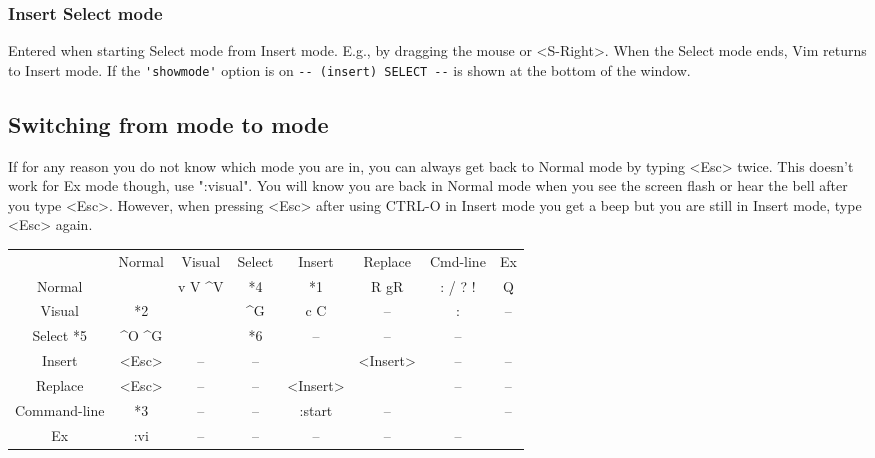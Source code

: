 \subsubsection{Insert Select mode}
Entered when starting Select mode from Insert mode.
E.g., by dragging the mouse or <S-Right>.
When the Select mode ends, Vim returns to Insert mode.
If the \verb!'showmode'! option is on \verb!-- (insert) SELECT --!
is shown at the bottom of the window.

\subsection{Switching from mode to mode}
\label{mode-switching}

If for any reason you do not know which mode you are in, you can always get back to Normal mode by typing <Esc> twice.
This doesn't work for Ex mode though, use ":visual".
You will know you are back in Normal mode when you see the screen flash or hear the bell after you type <Esc>.
However, when pressing <Esc> after using CTRL-O in Insert mode you get a beep but you are still in Insert mode, type <Esc> again.

\label{i_esc}
\begin{tabular}{c c c c c c c c}
				\backslashbox{FROM mode}{TO mode} & Normal & Visual                & Select & Insert   & Replace  & Cmd-line & Ex \\
				Normal                        &        & v       V       \textasciicircum V    & *4     & *1       & R gR     & : / ? !  & Q\\
				Visual                        & *2     &                       & \textasciicircum G     & c      C & --       & :        & --\\
				Select           *5     & \textasciicircum O                 \textasciicircum G &        & *6       & --       & --       & --\\
				Insert                            & <Esc>  & --                    & --     &          & <Insert> & --       & --\\
				Replace                           & <Esc>  & --                    & --     & <Insert> &          & --       & --\\
				Command-line                      & *3     & --                    & --     & :start   & --       &          & --\\
				Ex                                & :vi    & --                    & --     & --       & --       & --       & \\
\end{tabular}

